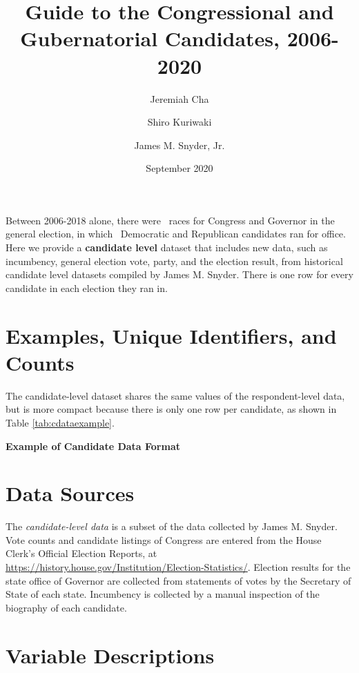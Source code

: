 \documentclass[12pt]{article}
\title{\large\textbf{Guide to the Congressional and Gubernatorial Candidates, 2006-2020}}
\author[1]{\normalsize Jeremiah Cha}
\author[2]{\normalsize Shiro Kuriwaki}
\author[1]{\normalsize James M. Snyder, Jr.}
\affil[1]{\footnotesize Department of Government, Harvard University.}
\affil[2]{\footnotesize To be Department of Political Science, Yale University}
\date{\normalsize September 2020}
\begin{document}
\maketitle 

Between 2006-2018 alone, there were \unskip \ races for Congress and Governor in the general election, in which \unskip \ Democratic and Republican candidates ran for office.  Here we provide a \textbf{candidate level} dataset that includes new data, such as incumbency, general election vote, party, and the election result, from historical candidate level datasets compiled by James M. Snyder. There is one row for every candidate in each election they ran in. 


\section{Examples, Unique Identifiers, and Counts}

The candidate-level dataset shares the same values of the respondent-level data, but is more compact because there is only one row per candidate, as shown in Table \ref{tab:cdataexample}.

\begin{table}[!h]
\caption{\textbf{Example of Candidate Data Format} \label{tab:cdataexample}}
\centering
\footnotesize

\end{table}



\section{Data Sources}

The \emph{candidate-level data} is a subset of the data collected by James M. Snyder. Vote counts and candidate listings of Congress are entered from the House Clerk's Official Election Reports, at \url{https://history.house.gov/Institution/Election-Statistics/}.  Election results for the state office of Governor are collected from statements of votes by the Secretary of State of each state.  Incumbency is collected by a manual inspection of the biography of each candidate. 

\clearpage

\section{Variable Descriptions}
\end{document}
